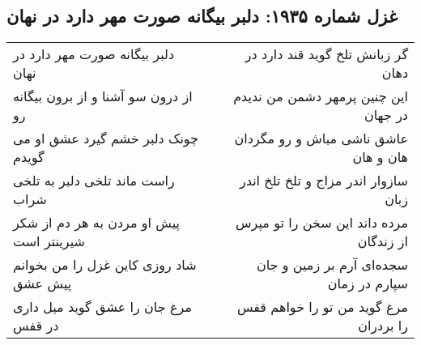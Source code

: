 \begin{center}
\section*{غزل شماره ۱۹۳۵: دلبر بیگانه صورت مهر دارد در نهان}
\label{sec:1935}
\begin{longtable}{l p{0.5cm} r}
دلبر بیگانه صورت مهر دارد در نهان
&&
گر زبانش تلخ گوید قند دارد در دهان
\\
از درون سو آشنا و از برون بیگانه رو
&&
این چنین پرمهر دشمن من ندیدم در جهان
\\
چونک دلبر خشم گیرد عشق او می گویدم
&&
عاشق ناشی مباش و رو مگردان هان و هان
\\
راست ماند تلخی دلبر به تلخی شراب
&&
سازوار اندر مزاج و تلخ تلخ اندر زبان
\\
پیش او مردن به هر دم از شکر شیرینتر است
&&
مرده داند این سخن را تو مپرس از زندگان
\\
شاد روزی کاین غزل را من بخوانم پیش عشق
&&
سجده‌ای آرم بر زمین و جان سپارم در زمان
\\
مرغ جان را عشق گوید میل داری در قفس
&&
مرغ گوید من تو را خواهم قفس را بردران
\\
\end{longtable}
\end{center}

